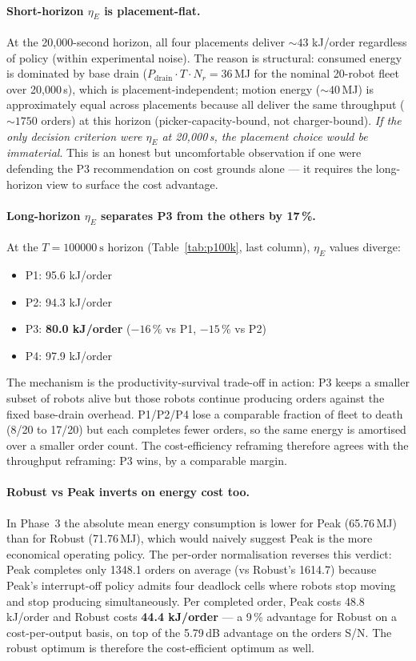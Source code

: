 \documentclass[conference]{IEEEtran}
\begin{document}
\paragraph{Short-horizon $\eta_E$ is placement-flat.}
At the 20{,}000-second horizon, all four placements deliver $\sim 43$ kJ/order regardless of policy (within experimental noise). The reason is structural: consumed energy is dominated by base drain ($P_\text{drain} \cdot T \cdot N_r = 36$\,MJ for the nominal 20-robot fleet over 20{,}000\,s), which is placement-independent; motion energy ($\sim 40$\,MJ) is approximately equal across placements because all deliver the same throughput ($\sim 1750$ orders) at this horizon (picker-capacity-bound, not charger-bound). \emph{If the only decision criterion were $\eta_E$ at 20{,}000\,s, the placement choice would be immaterial}. This is an honest but uncomfortable observation if one were defending the P3 recommendation on cost grounds alone --- it requires the long-horizon view to surface the cost advantage.

\paragraph{Long-horizon $\eta_E$ separates P3 from the others by 17\,\%.}
At the $T = \SI{100000}{\second}$ horizon (Table~\ref{tab:p100k}, last column), $\eta_E$ values diverge:

\begin{itemize}
  \item P1: 95.6 kJ/order
  \item P2: 94.3 kJ/order
  \item P3: \textbf{80.0 kJ/order} ($-16$\,\% vs P1, $-15$\,\% vs P2)
  \item P4: 97.9 kJ/order
\end{itemize}

The mechanism is the productivity-survival trade-off in action: P3 keeps a smaller subset of robots alive but those robots continue producing orders against the fixed base-drain overhead. P1/P2/P4 lose a comparable fraction of fleet to death (8/20 to 17/20) but each completes fewer orders, so the same energy is amortised over a smaller order count. The cost-efficiency reframing therefore agrees with the throughput reframing: P3 wins, by a comparable margin.

\paragraph{Robust vs Peak inverts on energy cost too.}
In Phase~3 the absolute mean energy consumption is lower for Peak (65.76\,MJ) than for Robust (71.76\,MJ), which would naively suggest Peak is the more economical operating policy. The per-order normalisation reverses this verdict: Peak completes only 1348.1 orders on average (vs Robust's 1614.7) because Peak's interrupt-off policy admits four deadlock cells where robots stop moving and stop producing simultaneously. Per completed order, Peak costs 48.8 kJ/order and Robust costs \textbf{44.4 kJ/order} --- a 9\,\% advantage for Robust on a cost-per-output basis, on top of the 5.79\,dB advantage on the orders S/N. The robust optimum is therefore the cost-efficient optimum as well.
\end{document}
